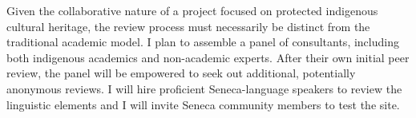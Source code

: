 \documentclass{neh}
\begin{document}
Given the collaborative nature of a project focused on protected indigenous
cultural heritage, the review process must necessarily be distinct from the
traditional academic model.
I plan to assemble a panel of consultants, including both indigenous academics
and non-academic experts.
After their own initial peer review, the panel will be empowered to seek
out additional, potentially anonymous reviews.
I will hire proficient Seneca-language speakers to review the linguistic
elements and I will invite Seneca community members to test the site.
\end{document}
